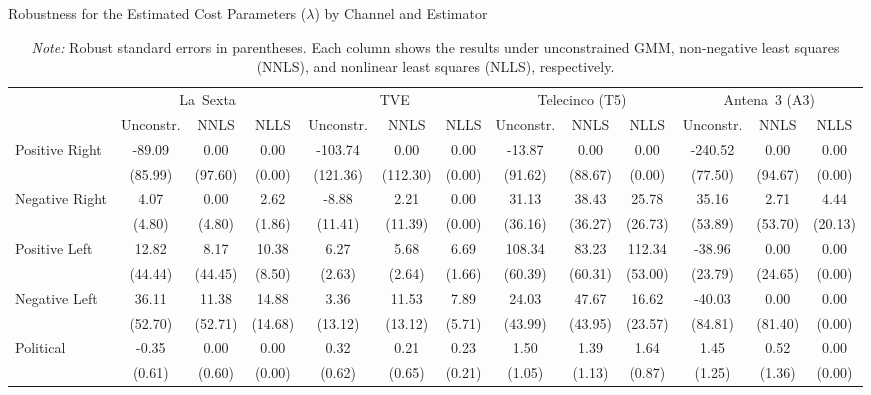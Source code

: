 \documentclass[12pt]{article}
\begin{document}
	
	\begin{table}
		\caption{Robustness for the Estimated Cost Parameters ($\lambda$) by Channel and Estimator}
		\label{tab:costs_robust}
		\centering\small
		\begin{tabular}{l|ccc|ccc|ccc|ccc|}
			\toprule
			& \multicolumn{3}{c|}{La~Sexta} & \multicolumn{3}{c|}{TVE} & \multicolumn{3}{c|}{Telecinco (T5)} & \multicolumn{3}{c|}{Antena~3 (A3)} \\
			& Unconstr. & NNLS & NLLS & Unconstr. & NNLS & NLLS & Unconstr. & NNLS & NLLS & Unconstr. & NNLS & NLLS \\
			\midrule
			Positive Right & -89.09 & 0.00 & 0.00 & -103.74 & 0.00 & 0.00 & -13.87 & 0.00 & 0.00 & -240.52 & 0.00 & 0.00 \\
			& (85.99) & (97.60) & (0.00) & (121.36) & (112.30) & (0.00) & (91.62) & (88.67) & (0.00) & (77.50) & (94.67) & (0.00) \\
			\midrule
				Negative Right & 4.07 & 0.00 & 2.62 & -8.88 & 2.21 & 0.00 & 31.13 & 38.43 & 25.78 & 35.16 & 2.71 & 4.44 \\
			& (4.80) & (4.80) & (1.86) & (11.41) & (11.39) & (0.00) & (36.16) & (36.27) & (26.73) & (53.89) & (53.70) & (20.13) \\
			\midrule
				Positive Left & 12.82 & 8.17 & 10.38 & 6.27 & 5.68 & 6.69 & 108.34 & 83.23 & 112.34 & -38.96 & 0.00 & 0.00 \\
			& (44.44) & (44.45) & (8.50) & (2.63) & (2.64) & (1.66) & (60.39) & (60.31) & (53.00) & (23.79) & (24.65) & (0.00) \\
			\midrule
			Negative Left & 36.11 & 11.38 & 14.88 & 3.36 & 11.53 & 7.89 & 24.03 & 47.67 & 16.62 & -40.03 & 0.00 & 0.00 \\
			& (52.70) & (52.71) & (14.68) & (13.12) & (13.12) & (5.71) & (43.99) & (43.95) & (23.57) & (84.81) & (81.40) & (0.00) \\
			\midrule
		
			Political & -0.35 & 0.00 & 0.00 & 0.32 & 0.21 & 0.23 & 1.50 & 1.39 & 1.64 & 1.45 & 0.52 & 0.00 \\
			& (0.61) & (0.60) & (0.00) & (0.62) & (0.65) & (0.21) & (1.05) & (1.13) & (0.87) & (1.25) & (1.36) & (0.00) \\
			\midrule
			\bottomrule
		\end{tabular}
		\vspace{0.5em}
		\caption*{\small \emph{Note:} Robust standard errors in parentheses. Each column shows the results under unconstrained GMM, non-negative least squares (NNLS), and nonlinear least squares (NLLS), respectively. }
	\end{table}
	
\end{document}
